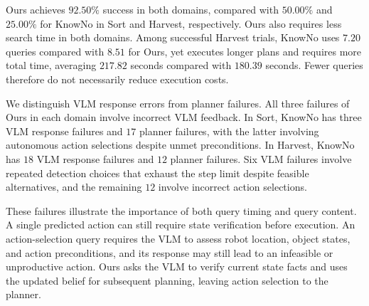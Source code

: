Ours achieves $92.50\%$ success in both domains, compared with $50.00\%$ and $25.00\%$ for KnowNo in Sort and Harvest, respectively. Ours also requires less search time in both domains. Among successful Harvest trials, KnowNo uses $7.20$ queries compared with $8.51$ for Ours, yet executes longer plans and requires more total time, averaging $217.82$ seconds compared with $180.39$ seconds. Fewer queries therefore do not necessarily reduce execution costs.

We distinguish VLM response errors from planner failures. All three failures of Ours in each domain involve incorrect VLM feedback. In Sort, KnowNo has three VLM response failures and $17$ planner failures, with the latter involving autonomous action selections despite unmet preconditions. In Harvest, KnowNo has $18$ VLM response failures and $12$ planner failures. Six VLM failures involve repeated detection choices that exhaust the step limit despite feasible alternatives, and the remaining $12$ involve incorrect action selections.

These failures illustrate the importance of both query timing and query content. A single predicted action can still require state verification before execution. An action-selection query requires the VLM to assess robot location, object states, and action preconditions, and its response may still lead to an infeasible or unproductive action. Ours asks the VLM to verify current state facts and uses the updated belief for subsequent planning, leaving action selection to the planner.





